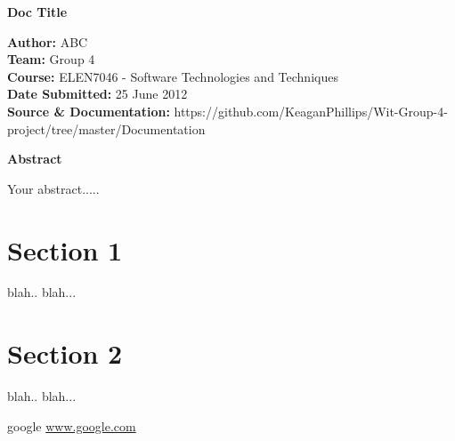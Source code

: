 \documentclass[a4paper,12pt]{article}
\begin{document}
\begin{center}
\begin{Huge}
\textbf{{\LARGE Doc Title }}
\linebreak
\linebreak
\linebreak
\linebreak
\end{Huge}\end{center}




\begin{small}
\begin{flushleft}
\textbf{Author:} ABC
\\
\textbf{Team:} Group 4
\\
\textbf{Course:} ELEN7046 - Software Technologies and Techniques
\\
\textbf{Date Submitted:} 25 June 2012
\\
\textbf{Source \& Documentation:} https://github.com/KeaganPhillips/Wit-Group-4-project/tree/master/Documentation
\linebreak
\linebreak
\linebreak
\linebreak
\linebreak
\end{flushleft}

\end{small}


\begin{flushleft}
\textbf{{\large Abstract}}
\end{flushleft}
Your abstract.....    
\clearpage


\tableofcontents


\clearpage

\section{Section 1}
blah.. blah...


\section{Section 2}
blah.. blah...

\clearpage
\begin{thebibliography}{5}
 google \url{www.google.com}
\end{thebibliography}

 
\end{document}
